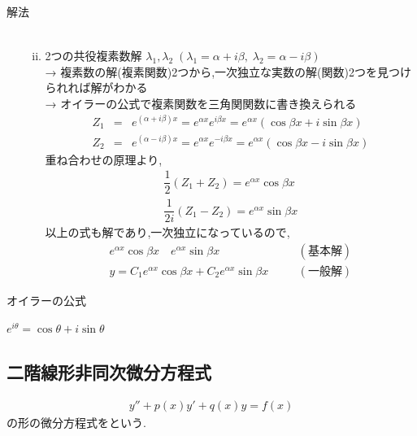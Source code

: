 \documentclass[a4paper]{jsarticle}
\begin{document}
\begin{itembox}[l]{解法}
\begin{enumerate}[(1)]
\begin{enumerate}[(i)]
\begin{eqnarray*}
                        \end{eqnarray*}
                  \item 2つの共役複素数解 $\lambda_1,\lambda_2\;\left(\lambda_1=\alpha +i\beta,\;\lambda_2=\alpha-i\beta\right)$\\
                        → 複素数の解(複素関数)2つから,一次独立な実数の解(関数)2つを見つけられれば解がわかる\\
                        → オイラーの公式で複素関数を三角関関数に書き換えられる\\
                        \begin{eqnarray*}
                            Z_1&=&e^{\left(\alpha+i\beta\right)x}=e^{\alpha x}e^{i\beta x}=e^{\alpha x}\left(\cos\beta x+i\sin\beta x\right)\\
                            Z_2&=&e^{\left(\alpha-i\beta\right)x}=e^{\alpha x}e^{-i\beta x}=e^{\alpha x}\left(\cos\beta x-i\sin\beta x\right)
                        \end{eqnarray*}
                        重ね合わせの原理より,
                        \begin{eqnarray*}
                            \dfrac{1}{2}\left(Z_1+Z_2\right)=e^{\alpha x}\cos\beta x\\
                            \dfrac{1}{2i}\left(Z_1-Z_2\right)=e^{\alpha x}\sin\beta x
                        \end{eqnarray*}
                        以上の式も解であり,一次独立になっているので,
                        \begin{eqnarray*}
                            e^{\alpha x}\cos\beta x\quad e^{\alpha x}\sin\beta x\quad &&(基本解)\\
                            y=C_1 e^{\alpha x}\cos\beta x+C_2e^{\alpha x}\sin\beta x\quad &&(一般解)
                        \end{eqnarray*}
              \end{enumerate}
    \end{enumerate}
\end{itembox}
\begin{itembox}[l]{オイラーの公式}
    \begin{center}
        $e^{i\theta}=\cos\theta+i\sin\theta$
    \end{center}
\end{itembox}
\subsection{二階線形非同次微分方程式}
\begin{eqnarray*}
    y''+p\left(x\right)y'+q\left(x\right)y=f\left(x\right)
\end{eqnarray*}
の形の微分方程式をという.
\end{document}
